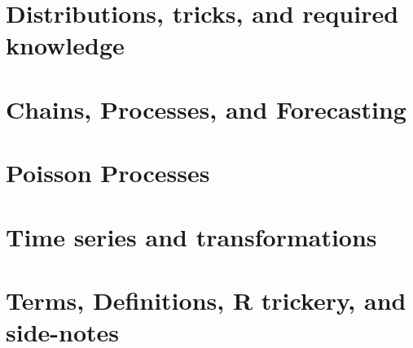 \documentclass[12pt]{report}
\begin{document}
\maketitle
\tableofcontents
\chapter{Distributions, tricks, and required knowledge}

\chapter{Chains, Processes, and Forecasting}

\chapter{Poisson Processes}

\chapter{Time series and transformations}

\chapter{Terms, Definitions, R trickery, and side-notes}

\end{document}
